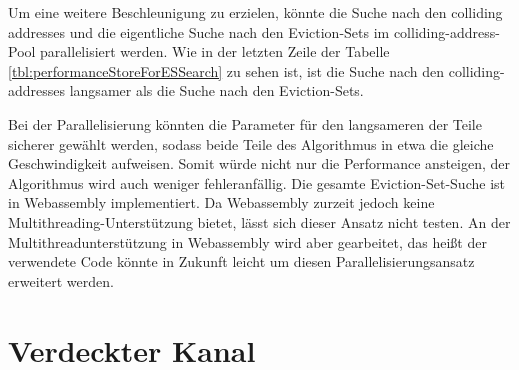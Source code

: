
Um eine weitere Beschleunigung zu erzielen, könnte die Suche nach den colliding addresses und die eigentliche Suche nach den Eviction-Sets im colliding-address-Pool parallelisiert werden. Wie in der letzten Zeile der Tabelle \ref{tbl:performanceStoreForESSearch} zu sehen ist, ist die Suche nach den colliding-addresses langsamer als die Suche nach den Eviction-Sets.

Bei der Parallelisierung könnten die Parameter für den langsameren der Teile sicherer gewählt werden, sodass beide Teile des Algorithmus in etwa die gleiche Geschwindigkeit aufweisen.
Somit würde nicht nur die Performance ansteigen, der Algorithmus wird auch weniger fehleranfällig.
Die gesamte Eviction-Set-Suche ist in Webassembly implementiert. Da Webassembly zurzeit jedoch keine Multithreading-Unterstützung \cite{WebassemblyThreads} bietet, lässt sich dieser Ansatz nicht testen.
An der Multithreadunterstützung in Webassembly wird aber gearbeitet, das heißt der verwendete Code könnte in Zukunft leicht um diesen Parallelisierungsansatz erweitert werden.

\section{Verdeckter Kanal}

